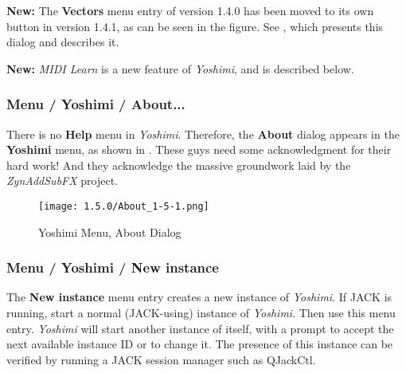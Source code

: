    \textbf{New:}
   The \textbf{Vectors} menu entry of version 1.4.0 has been moved to its own
   button in version 1.4.1, as can be seen in the figure.  See
   , which presents this dialog and
   describes it.

   \textbf{New:}
   \textsl{MIDI Learn} is a new feature of \textsl{Yoshimi}, and is described
   below.

%

\subsubsection{Menu / Yoshimi / About...}
\label{subsubsec:menu_yoshimi_about}

   There is no \textbf{Help} menu in \textsl{Yoshimi}.  Therefore, the
   \textbf{About} dialog appears in the \textbf{Yoshimi} menu, as shown in
   .
   These guys need some acknowledgment for their hard work!
   And they acknowledge the massive groundwork laid by the
   \textsl{ZynAddSubFX} project.

\begin{figure}[H]
   \centering 
   \texttt{[image: 1.5.0/About\_1-5-1.png]}
   \caption{Yoshimi Menu, About Dialog}
   \label{fig:yoshimi_about_dialog}
\end{figure}

\subsubsection{Menu / Yoshimi / New instance}
\label{subsubsec:menu_yoshimi_new_instance}

   The \textbf{New instance} menu entry creates a new instance of \textsl{Yoshimi}.
   If JACK is running,
   start a normal (JACK-using) instance of \textsl{Yoshimi}.
   Then use this menu entry.  \textsl{Yoshimi} will start another instance
   of itself, with a prompt to accept the next available instance ID or to
   change it.
   The presence of this instance can be verified by running a JACK session
   manager such as QJackCtl.

